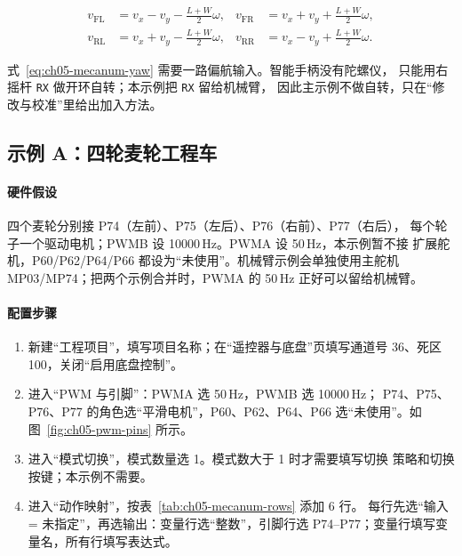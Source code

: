 \begin{equation}
\begin{aligned}
v_{\mathrm{FL}} &= v_x - v_y - \tfrac{L+W}{2}\omega, &
v_{\mathrm{FR}} &= v_x + v_y + \tfrac{L+W}{2}\omega, \\
v_{\mathrm{RL}} &= v_x + v_y - \tfrac{L+W}{2}\omega, &
v_{\mathrm{RR}} &= v_x - v_y + \tfrac{L+W}{2}\omega.
\end{aligned}
\label{eq:ch05-mecanum-yaw}
\end{equation}

式~\eqref{eq:ch05-mecanum-yaw} 需要一路偏航输入。智能手柄没有陀螺仪，
只能用右摇杆 \texttt{RX} 做开环自转；本示例把 \texttt{RX} 留给机械臂，
因此主示例不做自转，只在“修改与校准”里给出加入方法。

\subsection{示例 A：四轮麦轮工程车}

\paragraph*{硬件假设}
四个麦轮分别接 P74（左前）、P75（左后）、P76（右前）、P77（右后），
每个轮子一个驱动电机；PWMB 设 10000\,Hz。PWMA 设 50\,Hz，本示例暂不接
扩展舵机，P60/P62/P64/P66 都设为“未使用”。机械臂示例会单独使用主舵机
MP03/MP74；把两个示例合并时，PWMA 的 50\,Hz 正好可以留给机械臂。

\paragraph*{配置步骤}
\begin{enumerate}
  \item 新建“工程项目”，填写项目名称；在“遥控器与底盘”页填写通道号
        36、死区 100，关闭“启用底盘控制”。
  \item 进入“PWM 与引脚”：PWMA 选 50\,Hz，PWMB 选 10000\,Hz；
        P74、P75、P76、P77 的角色选“平滑电机”，P60、P62、P64、P66
        选“未使用”。如图~\ref{fig:ch05-pwm-pins} 所示。
  \item 进入“模式切换”，模式数量选 1。模式数大于 1 时才需要填写切换
        策略和切换按键；本示例不需要。
  \item 进入“动作映射”，按表~\ref{tab:ch05-mecanum-rows} 添加 6 行。
        每行先选“输入 = 未指定”，再选输出：变量行选“整数”，引脚行选
        P74--P77；变量行填写变量名，所有行填写表达式。
\end{enumerate}

